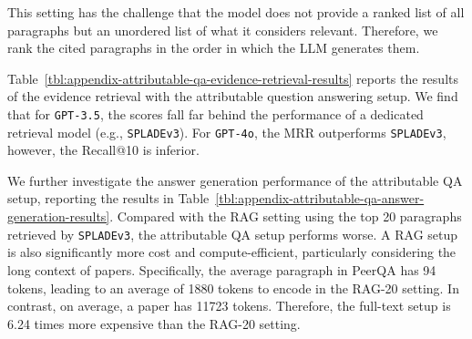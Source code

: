 \begin{multicols}{2}
This setting has the challenge that the model does not provide a ranked list of all paragraphs but an unordered list of what it considers relevant. Therefore, we rank the cited paragraphs in the order in which the LLM generates them.

Table~\ref{tbl:appendix-attributable-qa-evidence-retrieval-results} reports the results of the evidence retrieval with the attributable question answering setup. We find that for \texttt{GPT-3.5}, the scores fall far behind the performance of a dedicated retrieval model (e.g., \texttt{SPLADEv3}). For \texttt{GPT-4o}, the MRR outperforms \texttt{SPLADEv3}, however, the Recall@10 is inferior.

We further investigate the answer generation performance of the attributable QA setup, reporting the results in Table~\ref{tbl:appendix-attributable-qa-answer-generation-results}. Compared with the RAG setting using the top 20 paragraphs retrieved by \texttt{SPLADEv3}, the attributable QA setup performs worse. A RAG setup is also significantly more cost and compute-efficient, particularly considering the long context of papers. Specifically, the average paragraph in PeerQA has 94 tokens, leading to an average of 1880 tokens to encode in the RAG-20 setting. In contrast, on average, a paper has 11723 tokens. Therefore, the full-text setup is 6.24 times more expensive than the RAG-20 setting. 
\end{multicols}

